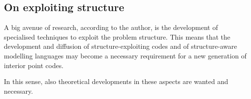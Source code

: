 %
%
\subsection*{On exploiting structure}

A big avenue of research, according to the author, is the development
of specialised techniques to exploit the problem structure.
This means that the development and diffusion of structure-exploiting
codes and of structure-aware modelling languages may become a necessary
requirement for a new generation of interior point codes.

In this sense, also theoretical developments in these aspects are 
wanted and necessary.
